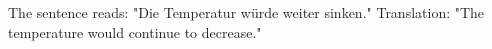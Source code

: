 The sentence reads:  
"Die Temperatur würde weiter sinken."  
Translation: "The temperature would continue to decrease."